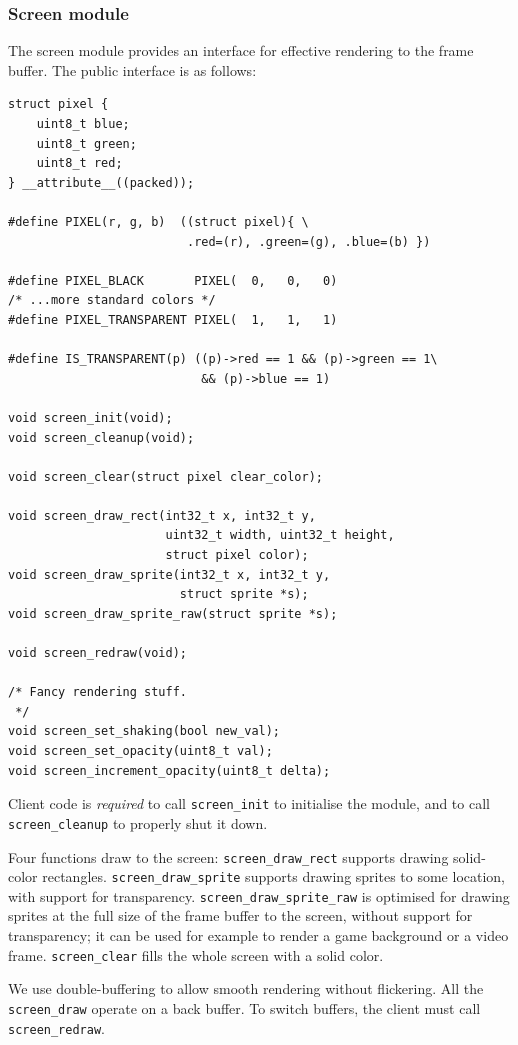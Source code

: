 \documentclass[a4paper,10pt]{article}
\newcommand{\isrc}[1]{\texttt{#1}}
\begin{document}
\subsubsection{Screen module}
The screen module provides an interface for effective rendering to the
frame buffer.  The public interface is as follows:
\begin{lstlisting}
struct pixel {
    uint8_t blue; 
    uint8_t green; 
    uint8_t red;
} __attribute__((packed));

#define PIXEL(r, g, b)  ((struct pixel){ \
                         .red=(r), .green=(g), .blue=(b) })

#define PIXEL_BLACK       PIXEL(  0,   0,   0)
/* ...more standard colors */
#define PIXEL_TRANSPARENT PIXEL(  1,   1,   1)

#define IS_TRANSPARENT(p) ((p)->red == 1 && (p)->green == 1\ 
                           && (p)->blue == 1)

void screen_init(void);
void screen_cleanup(void);

void screen_clear(struct pixel clear_color);

void screen_draw_rect(int32_t x, int32_t y,
                      uint32_t width, uint32_t height,
                      struct pixel color);
void screen_draw_sprite(int32_t x, int32_t y, 
                        struct sprite *s);
void screen_draw_sprite_raw(struct sprite *s);

void screen_redraw(void);

/* Fancy rendering stuff.
 */
void screen_set_shaking(bool new_val);
void screen_set_opacity(uint8_t val);
void screen_increment_opacity(uint8_t delta);
\end{lstlisting}
Client code is \emph{required} to call \isrc{screen\_init} to initialise
the module, and to call \isrc{screen\_cleanup} to properly shut it down.

Four functions draw to the screen: \isrc{screen\_draw\_rect} supports drawing
solid-color rectangles.  \isrc{screen\_draw\_sprite} supports drawing 
sprites to some location, with support for transparency.
\isrc{screen\_draw\_sprite\_raw} is optimised for drawing sprites at the full
size of the frame buffer to the screen, without support for transparency; it
can be used for example to render a game background or a video frame.
\isrc{screen\_clear} fills the whole screen with a solid color.

We use double-buffering to allow smooth rendering without flickering. All the
\isrc{screen\_draw} operate on a back buffer. To switch buffers, the client
must call \isrc{screen\_redraw}.
\end{document}
